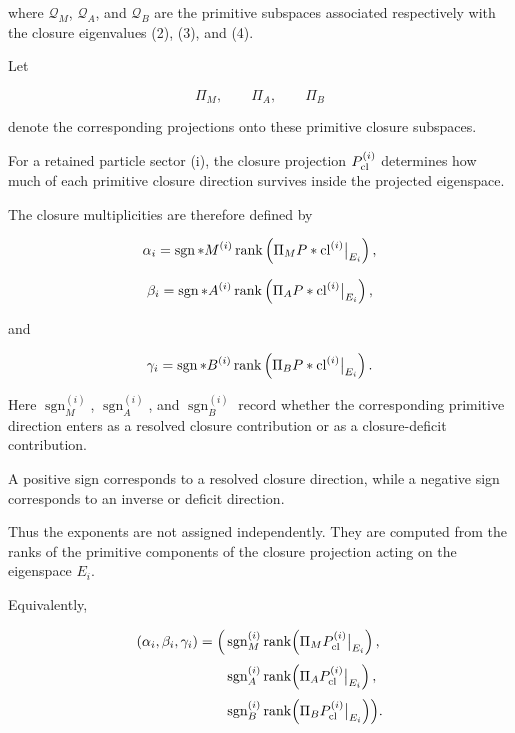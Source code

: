 \documentclass[11pt]{article}
\theoremstyle{definition}
\theoremstyle{remark}
\begin{document}
where \(\mathcal Q_M\), \(\mathcal Q_A\), and \(\mathcal Q_B\)
are the primitive subspaces associated respectively with the
closure eigenvalues (2), (3), and (4).

Let

\begin{equation}
\Pi_M,
\qquad
\Pi_A,
\qquad
\Pi_B
\end{equation}

denote the corresponding projections onto these primitive
closure subspaces.

For a retained particle sector (i), the closure projection
\(P_{\rm cl}^{(i)}\) determines how much of each primitive
closure direction survives inside the projected eigenspace.

The closure multiplicities are therefore defined by

\begin{equation}
\alpha_i = 
\operatorname{sgn}*M^{(i)}
\operatorname{rank}
\left(
\Pi_M P*{\rm cl}^{(i)}
\big|_{E_i}
\right),
\label{eq:alpha_extraction}
\end{equation}

\begin{equation}
\beta_i =
\operatorname{sgn}*A^{(i)}
\operatorname{rank}
\left(
\Pi_A P*{\rm cl}^{(i)}
\big|_{E_i}
\right),
\label{eq:beta_extraction}
\end{equation}

and

\begin{equation}
\gamma_i =
\operatorname{sgn}*B^{(i)}
\operatorname{rank}
\left(
\Pi_B P*{\rm cl}^{(i)}
\big|_{E_i}
\right).
\label{eq:gamma_extraction}
\end{equation}

Here
\(\operatorname{sgn}_M^{(i)}\),
\(\operatorname{sgn}_A^{(i)}\), and
\(\operatorname{sgn}_B^{(i)}\)
record whether the corresponding primitive direction enters as
a resolved closure contribution or as a closure-deficit
contribution.

A positive sign corresponds to a resolved closure direction,
while a negative sign corresponds to an inverse or deficit
direction.

Thus the exponents are not assigned independently. They are
computed from the ranks of the primitive components of the
closure projection acting on the eigenspace \(E_i\).

Equivalently,

\begin{equation}
\begin{aligned}
(\alpha_i,\beta_i,\gamma_i)
=
\Bigl(
&
\operatorname{sgn}_M^{(i)}
\operatorname{rank}
\!\left(
\Pi_M
P_{\rm cl}^{(i)}
\big|_{E_i}
\right),
\\[0.3em]
&
\operatorname{sgn}_A^{(i)}
\operatorname{rank}
\!\left(
\Pi_A
P_{\rm cl}^{(i)}
\big|_{E_i}
\right),
\\[0.3em]
&
\operatorname{sgn}_B^{(i)}
\operatorname{rank}
\!\left(
\Pi_B
P_{\rm cl}^{(i)}
\big|_{E_i}
\right)
\Bigr).
\end{aligned}
\label{eq:exponent_triplet_extraction}
\end{equation}
\end{document}
